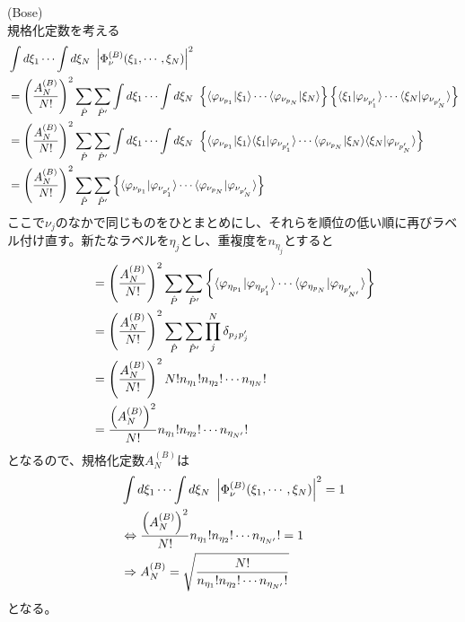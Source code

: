 \documentclass[dvipdfmx, 11pt, a4paper]{jsarticle}
\numberwithin{equation}{section}
\theoremstyle{definition}
\begin{document}
\begin{derivationBox}
        (Bose)\\
        規格化定数を考える
        \begin{align}
            &\int d\xi_1 \cdots \int d\xi_N\ \left| \Phi^{(B)}_\nu (\xi_1,\cdots,\xi_N) \right|^2  \notag \\
            &= \left( \frac{A_N^{(B)}}{N!} \right)^2 \sum_{\hat{P}} \sum_{\hat{P}'} \int d\xi_1 \cdots \int d\xi_N\ \left\{ \langle \varphi_{\nu_{p_1}}| \xi_{1} \rangle \cdots \langle \varphi_{\nu_{p_N}}| \xi_{N} \rangle \right\} \left\{ \langle \xi_{1}|\varphi_{\nu_{p_1'}} \rangle \cdots \langle \xi_{N}|\varphi_{\nu_{p_N'}} \rangle \right\} \notag \\
            &= \left( \frac{A_N^{(B)}}{N!} \right)^2 \sum_{\hat{P}} \sum_{\hat{P}'} \int d\xi_1 \cdots \int d\xi_N\ \left\{ \langle \varphi_{\nu_{p_1}}| \xi_{1} \rangle \langle \xi_{1}|\varphi_{\nu_{p_1'}} \rangle \cdots \langle \varphi_{\nu_{p_N}}| \xi_{N} \rangle \langle \xi_{N}|\varphi_{\nu_{p_N'}} \rangle \right\}  \notag \\
            &= \left( \frac{A_N^{(B)}}{N!} \right)^2 \sum_{\hat{P}} \sum_{\hat{P}'} \left\{ \langle \varphi_{\nu_{p_1}}|\varphi_{\nu_{p_1'}} \rangle \cdots \langle \varphi_{\nu_{p_N}}|\varphi_{\nu_{p_N'}} \rangle \right\} \notag 
        \end{align}
        ここで$\nu_j$のなかで同じものをひとまとめにし、それらを順位の低い順に再びラベル付け直す。新たなラベルを$\eta_j$とし、重複度を$n_{\eta_j}$とすると
        \begin{align}
            &= \left( \frac{A_N^{(B)}}{N!} \right)^2 \sum_{\hat{P}} \sum_{\hat{P}'} \left\{ \langle \varphi_{\eta_{p_1}}|\varphi_{\eta_{p_1'}} \rangle \cdots \langle \varphi_{\eta_{p_N}}|\varphi_{\eta_{p_{N'}'}} \rangle \right\} \notag \\
            &= \left( \frac{A_N^{(B)}}{N!} \right)^2 \sum_{\hat{P}} \sum_{\hat{P}'} \prod_j^{N} \delta_{p_jp_j'} \notag \\
            &= \left( \frac{A_N^{(B)}}{N!} \right)^2 N! n_{\eta_1}! n_{\eta_2}!\cdots n_{\eta_{N}}!\notag \\
            &= \frac{\left( A_N^{(B)} \right)^2 }{N!} n_{\eta_1}! n_{\eta_2}!\cdots n_{\eta_{N'}}!\notag
        \end{align}
        となるので、規格化定数$A_N^{(B)}$は
        \begin{align}
            &\int d\xi_1 \cdots \int d\xi_N\ \left| \Phi^{(B)}_\nu (\xi_1,\cdots,\xi_N) \right|^2  \notag  = 1 \notag \\
            &\Leftrightarrow \frac{\left( A_N^{(B)} \right)^2 }{N!} n_{\eta_1}! n_{\eta_2}!\cdots n_{\eta_{N'}}! =1 \notag \\
            &\Rightarrow A_N^{(B)} = \sqrt{\frac{N!}{n_{\eta_1}! n_{\eta_2}!\cdots n_{\eta_{N'}}!}} 
        \end{align}
        となる。
    \end{derivationBox}
\end{document}
